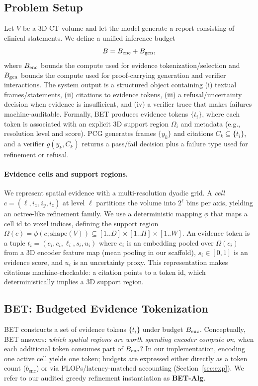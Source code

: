 \label{sec:method}

\subsection{Problem Setup}
Let $V$ be a 3D CT volume and let the model generate a report consisting of clinical statements.
We define a unified inference budget
\begin{equation}
  B = B_{\mathrm{enc}} + B_{\mathrm{gen}},
\end{equation}
where $B_{\mathrm{enc}}$ bounds the compute used for evidence tokenization/selection and $B_{\mathrm{gen}}$ bounds the compute used for proof-carrying generation and verifier interactions.
The system output is a structured object containing (i) textual frames/statements, (ii) citations to evidence tokens, (iii) a refusal/uncertainty decision when evidence is insufficient, and (iv) a verifier trace that makes failures machine-auditable.
Formally, BET produces evidence tokens $\{t_i\}$, where each token is associated with an explicit 3D support region $\Omega_i$ and metadata (e.g., resolution level and score).
PCG generates frames $\{y_k\}$ and citations $C_k \subseteq \{t_i\}$, and a verifier $g(y_k, C_k)$ returns a pass/fail decision plus a failure type used for refinement or refusal.

\paragraph{Evidence cells and support regions.}
We represent spatial evidence with a multi-resolution dyadic grid.
A \emph{cell} $c=(\ell, i_x, i_y, i_z)$ at level $\ell$ partitions the volume into $2^\ell$ bins per axis, yielding an octree-like refinement family.
We use a deterministic mapping $\phi$ that maps a cell id to voxel indices, defining the support region $\Omega(c)=\phi(c; \mathrm{shape}(V)) \subseteq [1..D]\times[1..H]\times[1..W]$.
An evidence token is a tuple $t_i=(e_i, c_i, \ell_i, s_i, u_i)$ where $e_i$ is an embedding pooled over $\Omega(c_i)$ from a 3D encoder feature map (mean pooling in our scaffold), $s_i\in[0,1]$ is an evidence score, and $u_i$ is an uncertainty proxy.
This representation makes citations machine-checkable: a citation points to a token id, which deterministically implies a 3D support region.

\subsection{BET: Budgeted Evidence Tokenization}
BET constructs a set of evidence tokens $\{t_i\}$ under budget $B_{\mathrm{enc}}$.
Conceptually, BET answers: \emph{which spatial regions are worth spending encoder compute on}, when each additional token consumes part of $B_{\mathrm{enc}}$?
In our implementation, encoding one active cell yields one token; budgets are expressed either directly as a token count ($b_{\mathrm{enc}}$) or via FLOPs/latency-matched accounting (Section~\ref{sec:exp}).
We refer to our audited greedy refinement instantiation as \textbf{BET-Alg}.

